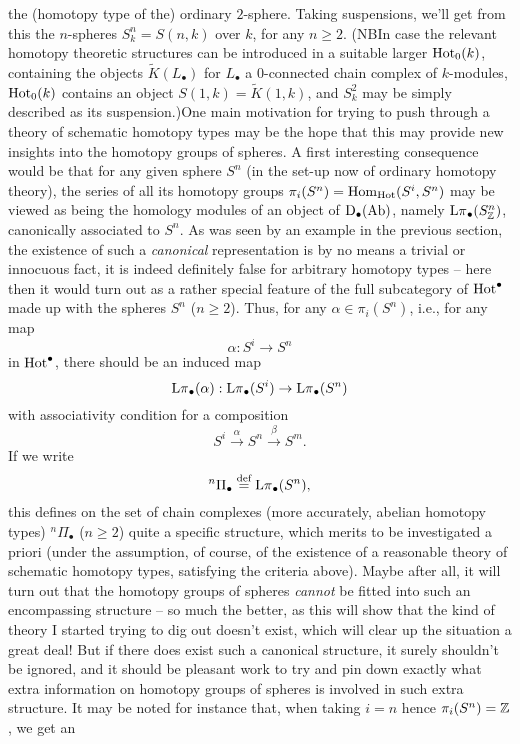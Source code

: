 the (homotopy type of the) ordinary $2$-sphere. Taking suspensions,
we'll get from this the $n$-spheres $S^n_k=S(n,k)$ over $k$, for any
$n\ge2$. (NB\enspace In case the relevant homotopy theoretic
structures can be introduced in a suitable larger $\operatorname{Hot}_0(k)$,
containing the objects $\widetilde K(L_\bullet)$ for $L_\bullet$ a
$0$-connected chain complex of $k$-modules, $\operatorname{Hot}_0(k)$ contains an
object $S(1,k)=\widetilde K(1,k)$, and $S^2_k$ may be simply described
as its suspension.)\enspace One main motivation for trying to push
through a theory of schematic homotopy types may be the hope that this
may provide new insights into the homotopy groups of spheres. A first
interesting consequence would be that for any given sphere $S^n$ (in
the set-up now of ordinary homotopy theory), the series of all its
homotopy groups $\pi_i(S^n)=\operatorname{Hom}_{\operatorname{Hot}}(S^i,S^n)$ may be viewed as
being the homology modules of an object of ${\mathrm{D}}_\bullet{\ensuremath{(\mathrm{Ab})}}$, namely
$\operatorname{L\pi}_\bullet(S^n_{\mathbb{Z}})$, canonically associated to $S^n$. As was seen
by an example in the previous section, the existence of such a
\emph{canonical} representation is by no means a trivial or innocuous
fact, it is indeed definitely false for arbitrary homotopy types --
here then it would turn out as a rather special feature of the full
subcategory of $\operatorname{Hot}^\bullet$ made up with the spheres $S^n$
($n\ge2$). Thus, for any $\alpha\in\pi_i(S^n)$, i.e., for any map
\[\alpha:S^i\to S^n\]
in $\operatorname{Hot}^\bullet$, there should be an induced map
\[\operatorname{L\pi}_\bullet(\alpha):\operatorname{L\pi}_\bullet(S^i)\to\operatorname{L\pi}_\bullet(S^n)\]
with associativity condition for a composition
\[S^i \xrightarrow\alpha{} S^n \xrightarrow\beta{} S^m.\]
If we write
\[{}^n\Pi_\bullet \overset{\textup{def}}{=} \operatorname{L\pi}_\bullet(S^n),\]
this defines on the set of chain complexes (more accurately, abelian
homotopy types) ${}^n\Pi_\bullet$ ($n\ge2$) quite a specific
structure, which merits to be investigated a priori (under the
assumption, of course, of the existence of a reasonable theory of
schematic homotopy types, satisfying the criteria above). Maybe after
all, it will turn out that the homotopy groups of spheres
\emph{cannot} be fitted into such an encompassing structure -- so much
the better, as this will show that the kind of theory I started trying
to dig out doesn't exist, which will clear up the situation a great
deal! But if there does exist such a canonical structure, it surely
shouldn't be ignored, and it should be pleasant work to try and pin
down exactly what extra information on homotopy groups of spheres
is involved in such extra structure. It may be noted for
instance that, when taking $i=n$ hence $\pi_i(S^n)={\mathbb{Z}}$, we get an
